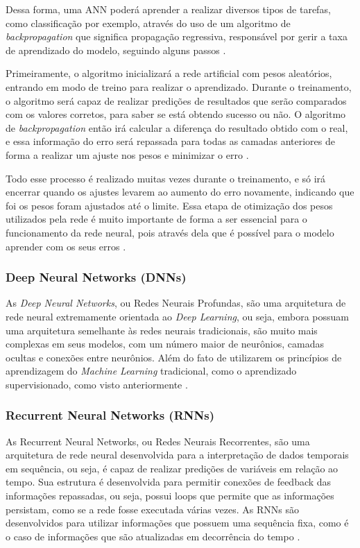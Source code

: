 Dessa forma, uma ANN poderá aprender a realizar diversos tipos de tarefas, como classificação por exemplo, através do uso de um algoritmo de \emph{backpropagation} que significa propagação regressiva, responsável por gerir a taxa de aprendizado do modelo, seguindo alguns passos \cite{deepLearningTensorFlow}.

Primeiramente, o algoritmo inicializará a rede artificial com pesos aleatórios, entrando em modo de treino para realizar o aprendizado. Durante o treinamento, o algoritmo será capaz de realizar predições de resultados que serão comparados com os valores corretos, para saber se está obtendo sucesso ou não. O algoritmo de \emph{backpropagation} então irá calcular a diferença do resultado obtido com o real, e essa informação do erro será repassada para todas as camadas anteriores de forma a realizar um ajuste nos pesos e minimizar o erro \cite{deepLearningTensorFlow}.

Todo esse processo é realizado muitas vezes durante o treinamento, e só irá encerrar quando os ajustes levarem ao aumento do erro novamente, indicando que foi os pesos foram ajustados até o limite. Essa etapa de otimização dos pesos utilizados pela rede é muito importante de forma a ser essencial para o funcionamento da rede neural, pois através dela que é possível para o modelo aprender com os seus erros \cite{deepLearningTensorFlow}.

\subsubsection{Deep Neural Networks (DNNs)}
As \emph{Deep Neural Networks}, ou Redes Neurais Profundas, são uma arquitetura de rede neural extremamente orientada ao \emph{Deep Learning}, ou seja, embora possuam uma arquitetura semelhante às redes neurais tradicionais, são muito mais complexas em seus modelos, com um número maior de neurônios, camadas ocultas e conexões entre neurônios. Além do fato de utilizarem os princípios de aprendizagem do \emph{Machine Learning} tradicional, como o aprendizado supervisionado, como visto anteriormente \cite{deepLearningTensorFlow}.

\subsubsection{Recurrent Neural Networks (RNNs)}
As Recurrent Neural Networks, ou Redes Neurais Recorrentes, são uma arquitetura de rede neural desenvolvida para a interpretação de dados temporais em sequência, ou seja, é capaz de realizar predições de variáveis em relação ao tempo. Sua estrutura é desenvolvida para permitir conexões de feedback das informações repassadas, ou seja, possui loops que permite que as informações persistam, como se a rede fosse executada várias vezes. As RNNs são desenvolvidos para utilizar informações que possuem uma sequência fixa, como é o caso de informações que são atualizadas em decorrência do tempo \cite{deepLearningTensorFlow}.

